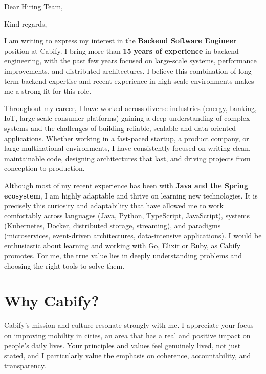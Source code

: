 \documentclass[11pt,a4paper,sans]{moderncv}
\begin{document}
\date{December 8th, 2025}
\subject{Backend Software Engineer}
\opening{Dear Hiring Team,}
\closing{Kind regards,}

\makelettertitle

\begin{justify}
I am writing to express my interest in the \textbf{Backend Software Engineer} position at Cabify. I bring more than \textbf{15 years of experience} in backend engineering, with the past few years focused on large-scale systems, performance improvements, and distributed architectures. I believe this combination of long-term backend expertise and recent experience in high-scale environments makes me a strong fit for this role.

Throughout my career, I have worked across diverse industries (energy, banking, IoT, large-scale consumer platforms) gaining a deep understanding of complex systems and the challenges of building reliable, scalable and data-oriented applications. Whether working in a fast-paced startup, a product company, or large multinational environments, I have consistently focused on writing clean, maintainable code, designing architectures that last, and driving projects from conception to production.

Although most of my recent experience has been with \textbf{Java and the Spring ecosystem}, I am highly adaptable and thrive on learning new technologies. It is precisely this curiosity and adaptability that have allowed me to work comfortably across languages (Java, Python, TypeScript, JavaScript), systems (Kubernetes, Docker, distributed storage, streaming), and paradigms (microservices, event-driven architectures, data-intensive applications). I would be enthusiastic about learning and working with Go, Elixir or Ruby, as Cabify promotes. For me, the true value lies in deeply understanding problems and choosing the right tools to solve them.

\section{Why Cabify?}

Cabify's mission and culture resonate strongly with me. I appreciate your focus on improving mobility in cities, an area that has a real and positive impact on people's daily lives. Your principles and values feel genuinely lived, not just stated, and I particularly value the emphasis on coherence, accountability, and transparency.


\end{justify}
\end{document}
